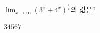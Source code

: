 $\displaystyle\lim_{x\to\infty}(3^x+4^x)^{\frac{1}{x}}$의 값은?
\begin{choices32}{$3$}{$4$}{$5$}{$6$}{$7$}\end{choices32}
